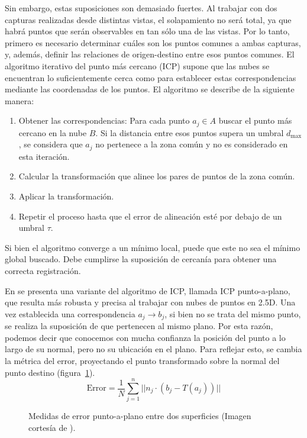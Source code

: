 Sin embargo, estas suposiciones son demasiado fuertes.
Al trabajar con dos capturas realizadas desde distintas vistas, el solapamiento no será total,
ya que habrá puntos que serán observables en tan sólo una de las vistas.
Por lo tanto, primero es necesario determinar cuáles son los puntos comunes a ambas capturas,
y, además, definir las relaciones de origen-destino entre esos puntos comunes.
El algoritmo iterativo del punto más cercano (ICP) supone que las nubes se encuentran
lo suficientemente cerca como para establecer estas correspondencias mediante las coordenadas de los puntos.
El algoritmo se describe de la siguiente manera:
\begin{enumerate}
	\item Obtener las correspondencias:
		Para cada punto $a_j \in A$ buscar el punto más cercano en la nube $B$.
		Si la distancia entre esos puntos supera un umbral $d_{\text{max}}$,
		se considera que $a_j$ no pertenece a la zona común y no es considerado en esta iteración.
	\item Calcular la transformación que alinee los pares de puntos de la zona común.
	\item Aplicar la transformación.
	\item Repetir el proceso hasta que el error de alineación esté por debajo de un umbral $\tau$.
\end{enumerate}%
Si bien el algoritmo converge a un mínimo local, puede que este no sea el mínimo global buscado.
Debe cumplirse la suposición de cercanía para obtener una correcta registración.\cite{regBesl92}

En \cite{chen-medoni} se presenta una variante del algoritmo de ICP, llamada ICP {punto-a-plano},
que resulta más robusta y precisa al trabajar con nubes de puntos en 2.5D.
Una vez establecida una correspondencia $a_j \to b_j$, si bien no se trata del mismo punto,
se realiza la suposición de que pertenecen al mismo plano.
Por esta razón, podemos decir que conocemos con mucha confianza la posición del punto
a lo largo de su normal, pero no su ubicación en el plano.
Para reflejar esto, se cambia la métrica del error, proyectando el punto transformado sobre la normal
del punto destino (figura~\ref{fig:point_to_plane}).
\[
	\text{Error} = \frac{1}{N} \sum_{j=1}^n || n_j \cdot \left( b_j - T \left(a_j\right) \right) ||
\]

\begin{figure}
	\centering
	
	\caption[Medidas de error punto-a-plano entre dos superficies]{\label{fig:point_to_plane}Medidas de error punto-a-plano entre dos superficies
	(Imagen cortesía de \cite{icp_point_to_plane}).}
\end{figure}


